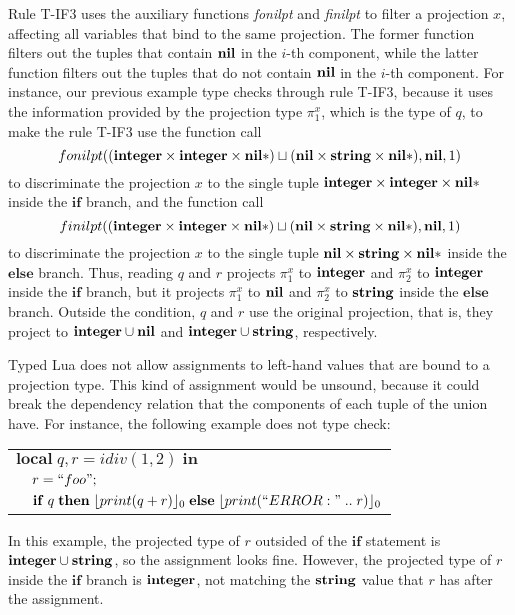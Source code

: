 Rule \textsc{T-IF3} uses the auxiliary functions \emph{fonilpt} and \emph{finilpt}
to filter a projection $x$, affecting all variables that bind to the same projection.
The former function filters out the tuples that contain $\mathbf{nil}$ in the $i$-th component,
while the latter function filters out the tuples that do not contain $\mathbf{nil}$ in the $i$-th component.
For instance, our previous example type checks through rule \textsc{T-IF3},
because it uses the information provided by the projection type $\pi_{1}^{x}$,
which is the type of $q$, to make the rule \textsc{T-IF3} use the function call
\[
fonilpt((\mathbf{integer} \times \mathbf{integer} \times \mathbf{nil}{*}) \sqcup (\mathbf{nil} \times \mathbf{string} \times \mathbf{nil}{*}), \mathbf{nil}, 1)
\]
to discriminate the projection $x$ to the single tuple
$\mathbf{integer} \times \mathbf{integer} \times \mathbf{nil}{*}$ inside the $\mathbf{if}$ branch,
and the function call
\[
finilpt((\mathbf{integer} \times \mathbf{integer} \times \mathbf{nil}{*}) \sqcup (\mathbf{nil} \times \mathbf{string} \times \mathbf{nil}{*}), \mathbf{nil}, 1)
\]
to discriminate the projection $x$ to the single tuple
$\mathbf{nil} \times \mathbf{string} \times \mathbf{nil}{*}$ inside the $\mathbf{else}$ branch.
Thus, reading $q$ and $r$ projects $\pi_{1}^{x}$ to $\mathbf{integer}$ and
$\pi_{2}^{x}$ to $\mathbf{integer}$ inside the $\mathbf{if}$ branch,
but it projects $\pi_{1}^{x}$ to $\mathbf{nil}$ and $\pi_{2}^{x}$ to $\mathbf{string}$
inside the $\mathbf{else}$ branch.
Outside the condition, $q$ and $r$ use the original projection, that is,
they project to $\mathbf{integer} \cup \mathbf{nil}$ and $\mathbf{integer} \cup \mathbf{string}$, respectively.

Typed Lua does not allow assignments to left-hand values that are bound
to a projection type.
This kind of assignment would be unsound, because it could break the
dependency relation that the components of each tuple of the union have.
For instance, the following example does not type check:
\begin{center}
\begin{tabular}{ll}
\multicolumn{2}{l}{$\mathbf{local} \; q, r = idiv(1, 2) \; \mathbf{in}$}\\
& \multicolumn{1}{l}{$r = ``foo";$}\\
& \multicolumn{1}{l}{$\mathbf{if} \; q \; \mathbf{then} \; \lfloor print(q + r) \rfloor_{0} \; \mathbf{else} \; \lfloor print(``ERROR: " \; .. \; r) \rfloor_{0}$}
\end{tabular}
\end{center}

In this example, the projected type of $r$ outsided of the $\mathbf{if}$
statement is $\mathbf{integer} \cup \mathbf{string}$, so the assignment looks fine.
However, the projected type of $r$ inside the $\mathbf{if}$ branch is $\mathbf{integer}$,
not matching the $\mathbf{string}$ value that $r$ has after the assignment.
